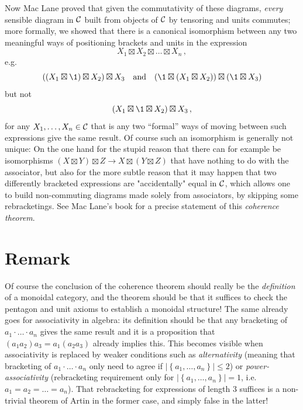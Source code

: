         Now Mac Lane proved that given the commutativity of these diagrams, \emph{every} sensible diagram in $\mathcal{C}$ built from objects of $\mathcal{C}$ by tensoring and units commutes; more formally, we showed that there is a canonical isomorphism between any two meaningful ways of positioning brackets and units in the expression
        \begin{equation*}
            X_1 \boxtimes X_2 \boxtimes \ldots \boxtimes X_n \,,
        \end{equation*}
        e.g.
        \begin{equation*}
            ((X_1 \boxtimes \1) \boxtimes X_2) \boxtimes X_3 \quad \text{and} \quad (\1 \boxtimes (X_1 \boxtimes X_2)) \boxtimes (\1 \boxtimes X_3)
        \end{equation*}
        but not
        \begin{equation*}
            (X_1 \boxtimes \1 \boxtimes X_2) \boxtimes X_3 \,,
        \end{equation*}
        for any $X_1, \ldots, X_n \in \mathcal{C}$ that is any two ``formal'' ways of moving between such expressions give the same result. Of course such an isomorphism is generally not unique: On the one hand for the stupid reason that there can for example be isomorphisms $(X \boxtimes Y) \boxtimes Z \to X \boxtimes (Y \boxtimes Z)$ that have nothing to do with the associator, but also for the more subtle reason that it may happen that two differently bracketed expressions are "accidentally" equal in $\mathcal{C}$, which allows one to build non-commuting diagrams made solely from associators, by skipping some rebracketings. See Mac Lane's book for a precise statement of this \emph{coherence theorem}.

    \section{Remark}
        Of course the conclusion of the coherence theorem should really be the \emph{definition} of a monoidal category, and the theorem should be that it suffices to check the pentagon and unit axioms to establish a monoidal structure! The same already goes for associativity in algebra: its definition should be that any bracketing of $a_1 \cdot \ldots \cdot a_n$ gives the same result and it is a proposition that $(a_1 a_2) a_3 = a_1 (a_2 a_3)$ already implies this. This becomes visible when associativity is replaced by weaker conditions such as \emph{alternativity} (meaning that bracketing of $a_1 \cdot \ldots \cdot a_n$ only need to agree if $| \left\{ a_1, \ldots, a_n \right\}| \leq 2$) or \emph{power-associativity} (rebracketing requirement only for $| \left\{ a_1, \ldots, a_n \right\}| = 1$, i.e. $a_1 = a_2 = \ldots = a_n$). That rebracketing for expressions of length $3$ suffices is a non-trivial theorem of Artin in the former case, and simply false in the latter!


